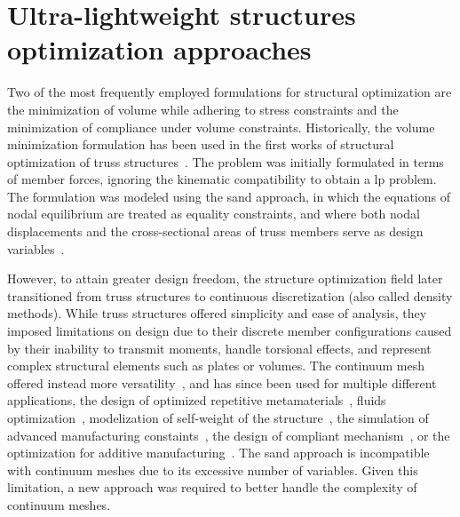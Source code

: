 \section{Ultra-lightweight structures optimization approaches}

Two of the most frequently employed formulations for structural optimization are the minimization of volume while adhering to stress constraints and the minimization of compliance under volume constraints. Historically, the volume minimization formulation has been used in the first works of structural optimization of truss structures~. The problem was initially formulated in terms of member forces, ignoring the kinematic compatibility to obtain a \gls{lp} problem. The formulation was modeled using the \gls{sand} approach, in which the equations of nodal equilibrium are treated as equality constraints, and where both nodal displacements and the cross-sectional areas of truss members serve as design variables~. 

However, to attain greater design freedom, the structure optimization field later transitioned from truss structures to continuous discretization (also called density methods). While truss structures offered simplicity and ease of analysis, they imposed limitations on design due to their discrete member configurations caused by their inability to transmit moments, handle torsional effects, and represent complex structural elements such as plates or volumes. The continuum mesh offered instead more versatility~, and has since been used for multiple different applications, \eg the design of optimized repetitive metamaterials~, fluids optimization~, modelization of self-weight of the structure~, the simulation of advanced manufacturing constaints~, the design of compliant mechanism~, or the optimization for additive manufacturing~. The \gls{sand} approach is incompatible with continuum meshes due to its excessive number of variables. Given this limitation, a new approach was required to better handle the complexity of continuum meshes.

